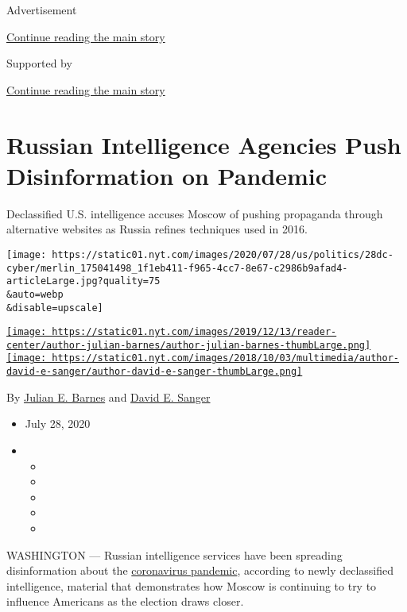 Advertisement

\protect\hyperlink{after-top}{Continue reading the main story}

Supported by

\protect\hyperlink{after-sponsor}{Continue reading the main story}

\hypertarget{russian-intelligence-agencies-push-disinformation-on-pandemic}{%
\section{Russian Intelligence Agencies Push Disinformation on
Pandemic}\label{russian-intelligence-agencies-push-disinformation-on-pandemic}}

Declassified U.S. intelligence accuses Moscow of pushing propaganda
through alternative websites as Russia refines techniques used in 2016.

\texttt{[image: https://static01.nyt.com/images/2020/07/28/us/politics/28dc-cyber/merlin\_175041498\_1f1eb411-f965-4cc7-8e67-c2986b9afad4-articleLarge.jpg?quality=75\\\&auto=webp\\\&disable=upscale]}

\href{https://www.nytimes.com/by/julian-e-barnes}{\texttt{[image: https://static01.nyt.com/images/2019/12/13/reader-center/author-julian-barnes/author-julian-barnes-thumbLarge.png]}}\href{https://www.nytimes.com/by/david-e-sanger}{\texttt{[image: https://static01.nyt.com/images/2018/10/03/multimedia/author-david-e-sanger/author-david-e-sanger-thumbLarge.png]}}

By \href{https://www.nytimes.com/by/julian-e-barnes}{Julian E. Barnes}
and \href{https://www.nytimes.com/by/david-e-sanger}{David E. Sanger}

\begin{itemize}
\item
  July 28, 2020
\item
  \begin{itemize}
  \item
  \item
  \item
  \item
  \item
  \end{itemize}
\end{itemize}

WASHINGTON --- Russian intelligence services have been spreading
disinformation about the
\href{https://www.nytimes.com/news-event/coronavirus}{coronavirus
pandemic}, according to newly declassified intelligence, material that
demonstrates how Moscow is continuing to try to influence Americans as
the election draws closer.

